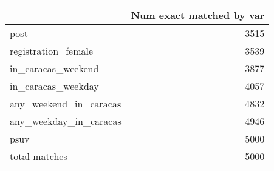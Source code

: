 \begin{tabular}{lr}
\toprule
{} &  Num exact matched by var \\
\midrule
post                   &                      3515 \\
registration\_female    &                      3539 \\
in\_caracas\_weekend     &                      3877 \\
in\_caracas\_weekday     &                      4057 \\
any\_weekend\_in\_caracas &                      4832 \\
any\_weekday\_in\_caracas &                      4946 \\
psuv                   &                      5000 \\
total matches          &                      5000 \\
\bottomrule
\end{tabular}
